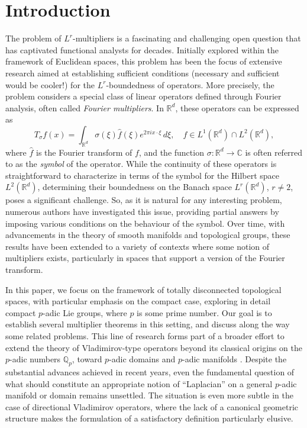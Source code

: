 \documentclass[12pt, reqno]{amsart}
\newcommand{\Q}{\mathbb{Q}}
\newcommand{\1}{\mathds{1}}
\begin{document}
\section{Introduction}
The problem of $L^r$-multipliers is a fascinating and challenging open question that has captivated functional analysts for decades. Initially explored within the framework of Euclidean spaces, this problem has been the focus of extensive research aimed at establishing sufficient conditions (necessary and sufficient would be cooler!) for the $L^r$-boundedness of operators. More precisely, the problem considers a special class of linear operators defined through Fourier analysis, often called \emph{Fourier multipliers}. In $\mathbb{R}^d$, these operators can be expressed as 
\[
T_\sigma f(x) = \int_{\mathbb{R}^d} \sigma(\xi) \hat{f}(\xi) e^{2 \pi i x \cdot \xi} \, d\xi, \quad f \in L^1(\mathbb{R}^d) \cap L^2(\mathbb{R}^d),
\] where $\widehat{f}$ is the Fourier transform of $f$, and the function $\sigma: \mathbb{R}^d \to \mathbb{C}$ is often referred to as the \emph{symbol} of the operator. While the continuity of these operators is straightforward to characterize in terms of the symbol for the Hilbert space $L^2(\mathbb{R}^d)$, determining their boundedness on the Banach space $L^r(\mathbb{R}^d)$, $r \neq 2$, poses a significant challenge. So, as it is natural for any interesting problem, numerous authors have investigated this issue, providing partial answers by imposing various conditions on the behaviour of the symbol. Over time, with advancements in the theory of smooth manifolds and topological groups, these results have been extended to a variety of contexts where some notion of multipliers exists, particularly in spaces that support a version of the Fourier transform. 

In this paper, we focus on the framework of totally disconnected topological spaces, with particular emphasis on the compact case, exploring in detail compact $p$-adic Lie groups, where $p$ is some prime number. Our goal is to establish several multiplier theorems in this setting, and discuss along the way some related problems. This line of research forms part of a broader effort to extend the theory of Vladimirov-type operators \cite{Bendikov2014, Dragovich2017} beyond its classical origins on the $p$-adic numbers $\Q_p$, toward $p$-adic domains \cite{zuniga1, zuniga2, Zuniga3} and $p$-adic manifolds \cite{bradley1, bradley2, bradley3}. Despite the substantial advances achieved in recent years, even the fundamental question of what should constitute an appropriate notion of “Laplacian” on a general $p$-adic manifold or domain remains unsettled. The situation is even more subtle in the case of directional Vladimirov operators, where the lack of a canonical geometric structure makes the formulation of a satisfactory definition particularly elusive.
\end{document}
